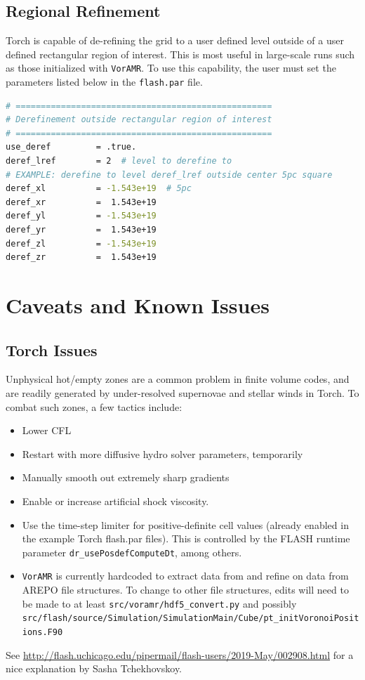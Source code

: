 \documentclass[10pt]{article}
\begin{document}
\subsection{Regional Refinement}

Torch is capable of de-refining the grid to a user defined level outside of a user defined rectangular region of interest. This is most useful in large-scale runs such as those initialized with \texttt{VorAMR}. To use this capability, the user must set the parameters listed below in the \texttt{flash.par} file. 

\begin{lstlisting}[language=bash]
# ===================================================
# Derefinement outside rectangular region of interest
# ===================================================
use_deref         = .true.
deref_lref        = 2  # level to derefine to
# EXAMPLE: derefine to level deref_lref outside center 5pc square
deref_xl          = -1.543e+19  # 5pc
deref_xr          =  1.543e+19 
deref_yl          = -1.543e+19
deref_yr          =  1.543e+19
deref_zl          = -1.543e+19
deref_zr          =  1.543e+19
\end{lstlisting}


\section{Caveats and Known Issues}
\label{sec:caveats}

\subsection{Torch Issues}
Unphysical hot/empty zones are a common problem in finite volume codes, and are
readily generated by under-resolved supernovae and stellar winds in Torch.  To
combat such zones, a few tactics include:
\begin{itemize}
    \item Lower CFL
    \item Restart with more diffusive hydro solver parameters, temporarily
    \item Manually smooth out extremely sharp gradients
    \item Enable or increase artificial shock viscosity.
    \item Use the time-step limiter for positive-definite cell values (already
        enabled in the example Torch flash.par files).  This is controlled by
        the FLASH runtime parameter \texttt{dr\_usePosdefComputeDt}, among
        others.
    \item \texttt{VorAMR} is currently hardcoded to extract data from and refine on data from AREPO file structures. To change to other file structures, edits will need to be made to at least \texttt{src/voramr/hdf5\_convert.py} and possibly \texttt{src/flash/source/Simulation/SimulationMain/Cube/pt\_initVoronoiPositions.F90}
\end{itemize}
See \url{http://flash.uchicago.edu/pipermail/flash-users/2019-May/002908.html}
for a nice explanation by Sasha Tchekhovskoy.
\end{document}

